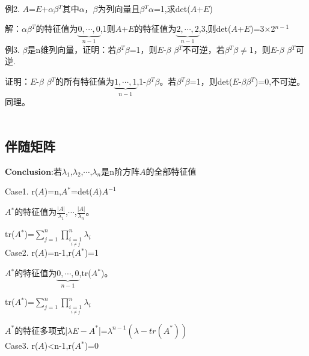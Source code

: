 \documentclass[a4paper,12pt]{book}
\begin{document}
  ~\\
  
  例2. $\mathit{A}$=$\mathit{E}$+$\alpha$$\beta$$^{T}$其中$\alpha$，$\beta$为列向量且$\beta$$^{T}$$\alpha$=1,求det($\mathit{A}$+$\mathit{E}$)
  
  解：$\alpha$$\beta$$^{T}$的特征值为$\underset{n-1}{\underbrace{0,\cdots ,0} } $,1则$\mathit{A}$+$\mathit{E}$的特征值为$\underset{n-1}{\underbrace{2,\cdots ,2} } $,3,则det($\mathit{A}$+$\mathit{E}$)=3$\times$2$^{n-1}$
  ~\\
  
  例3. $\beta$是n维列向量，证明：若$\beta$$^{T}$$\beta$=1，则$\mathit{E}$-$\beta$
  $\beta$$^{T}$不可逆，若$\beta$$^{T}$$\beta$$\ne$1，则$\mathit{E}$-$\beta$
  $\beta$$^{T}$可逆.
  
  证明：$\mathit{E}$-$\beta$
  $\beta$$^{T}$的所有特征值为$\underset{n-1}{\underbrace{1,\cdots ,1} } $,1-$\beta$$^{T}$$\beta$。若$\beta$$^{T}$$\beta$=1，则det($\mathit{E}$-$\beta$$\beta$$^{T}$)=0,不可逆。同理。
  ~\\
  ~\\
  
\subsection{伴随矩阵}


 $\mathbf{Conclusion}$:若$\lambda$$_{1}$,$\lambda$$_{2}$,$\cdots$,$\lambda$$_{n}$是n阶方阵$\mathit{A}$的全部特征值
 
 Case1. r($\mathit{A}$)=n,$\mathit{A}$$^{*}$=det($\mathit{A}) 
 $$\mathit{A^{-1}}$
 
$\mathit{A}$$^{*}$的特征值为$\frac{|A|}{\lambda_{1}}$,$\cdots$,$\frac{|A|}{\lambda_{n}}$。

tr($\mathit{A}$$^{*}$)=$\sum_{j=1}^{n}\prod_{\underset{i\ne j}{i=1} }^{n}  \lambda_{i} $
~\\

Case2. r($\mathit{A}$)=n-1,r($\mathit{A}$$^{*}$)=1

$\mathit{A}$$^{*}$的特征值为$\underset{n-1}{\underbrace{0,\cdots ,0} } $,tr($\mathit{A}$$^{*}$)。

tr($\mathit{A}$$^{*}$)=$\sum_{j=1}^{n}\prod_{\underset{i\ne j}{i=1} }^{n}  \lambda_{i} $

$\mathit{A}^{*}$的特征多项式|$\lambda\mathit{E-{A}^{*}}$|=$\lambda^{n-1}(\lambda-tr(\mathit{A}^{*}))$
~\\


Case3. r($\mathit{A}$)<n-1,r($\mathit{A}$$^{*}$)=0
\end{document}

